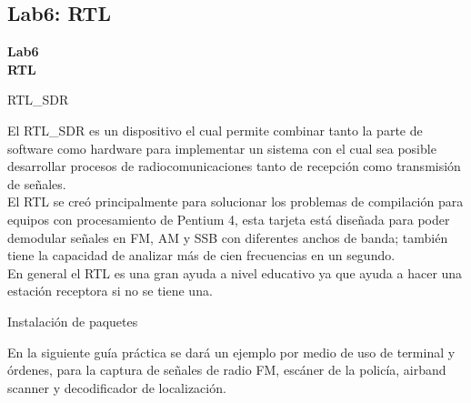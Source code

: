 \subsection{Lab6: RTL}
\begin{frame}{}


\bfseries{\textrm{\LARGE Lab6\\ \Large RTL}}
\raggedright
\end{frame}

\begin{frame}{RTL\_SDR}



El RTL\_SDR es un dispositivo el cual permite combinar tanto la parte de software como hardware para implementar un sistema con el cual sea posible desarrollar procesos de radiocomunicaciones tanto de recepción como transmisión de señales.\\ \vspace{2mm}
El RTL se creó principalmente para solucionar los problemas de compilación para equipos con procesamiento de Pentium 4, esta tarjeta está diseñada para poder demodular señales en FM, AM y SSB con diferentes anchos de banda; también tiene la capacidad de analizar más de cien frecuencias en un segundo.\\\vspace{2mm}
En general el RTL es una gran ayuda a nivel educativo ya que ayuda a hacer una estación receptora si no se tiene una.


\end{frame}
\begin{frame}{Instalación de paquetes}

En la siguiente guía práctica se dará un ejemplo por medio de uso de terminal y órdenes, para la captura de señales de radio FM, escáner de la policía, airband scanner y decodificador de localización.

\end{frame}

